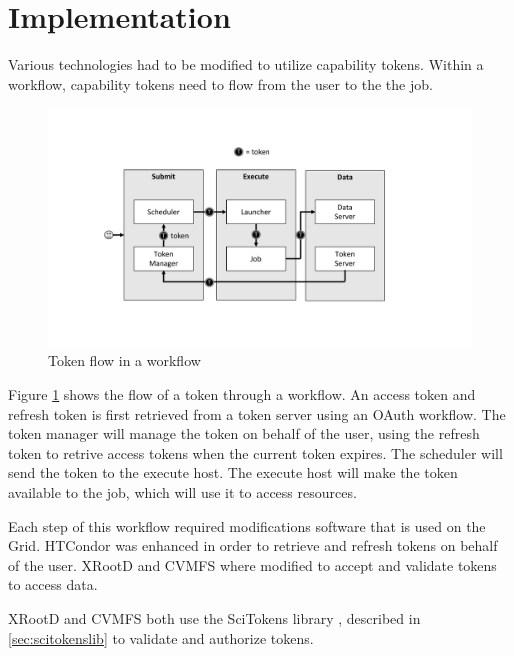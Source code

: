 \documentclass{webofc}
\begin{document}
\section{Implementation}
\label{sec:implementation}

Various technologies had to be modified to utilize capability tokens.  Within a workflow, capability tokens need to flow from the user to the the job.  

\begin{figure}[ht]
\includegraphics[width=\textwidth]{images/SciTokensFlow.pdf}
\caption{Token flow in a workflow}
\label{fig:tokenflow}
\end{figure}

Figure \ref{fig:tokenflow} shows the flow of a token through a workflow.  An access token and refresh token is first retrieved from a token server using an OAuth workflow.  The token manager will manage the token on behalf of the user, using the refresh token to retrive access tokens when the current token expires.  The scheduler will send the token to the execute host.  The execute host will make the token available to the job, which will use it to access resources.

Each step of this workflow required modifications software that is used on the Grid.  HTCondor \cite{condor-practice} was enhanced in order to retrieve and refresh tokens on behalf of the user.  XRootD \cite{dorigo2005xrootd} and CVMFS \cite{buncic2010cernvm} where modified to accept and validate tokens to access data.

XRootD and CVMFS both use the SciTokens library \cite{scitokens-lib}, described in \ref{sec:scitokenslib} to validate and authorize tokens.
\end{document}
